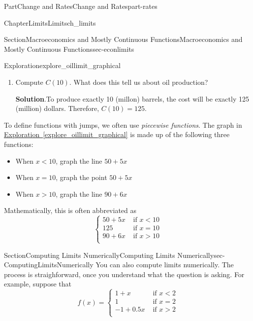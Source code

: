 \documentclass[oneside,10pt,]{tufte-book}
\newcommand{\blocktitlefont}{\relax}
\newcommand{\xreffont}{\relax}
\numberwithin{equation}{chapter}
\newcommand{\lt}{<}
\newcommand{\gt}{>}
\begin{document}
\begin{partptx}{Part}{Change and Rates}{}{Change and Rates}{}{}{part-rates}
\begin{chapterptx}{Chapter}{Limits}{}{Limits}{}{}{ch_limits}
\begin{sectionptx}{Section}{Macroeconomics and Mostly Continuous Functions}{}{Macroeconomics and Mostly Continuous Functions}{}{}{sec-econlimits}
\begin{exploration}{Exploration}{}{explore_oillimit_graphical}
\begin{enumerate}[font=\bfseries,label=(\alph*),ref=\alph*]
\item{}Compute \(C(10).\) What does this tell us about oil production?%
\par\smallskip%
\noindent\textbf{\blocktitlefont Solution}.\hypertarget{explore_oillimit_graphical-4-2}{}\quad{}To produce exactly 10 (millon) barrels, the cost will be exactly \textdollar{}125 (million) dollars. Therefore,   \(C(10)= 125.\)%
\end{enumerate}%
\end{exploration}%
To define functions with jumps, we often use \emph{piecewise functions}. The graph in \hyperref[explore_oillimit_graphical]{Exploration~{\xreffont\ref{explore_oillimit_graphical}}} is made up of the following three functions:%
\begin{itemize}[label=\textbullet]
\item{}When \(x\lt 10\), graph the line \(50 + 5x\)%
\item{}When \(x = 10\), graph the point \(50 + 5x\)%
\item{}When \(x\gt 10\), graph the line \(90 + 6x\)%
\end{itemize}
Mathematically, this is often abbreviated as%
\begin{equation*}
\begin{cases}
50 + 5x & \text{ if } x\lt 10 \\ 
125     & \text{ if } x = 10 \\ 
90 + 6x & \text{ if } x\gt 10 \\ 
\end{cases}
\end{equation*}
%
\end{sectionptx}
%
%
\typeout{************************************************}
\typeout{************************************************}
%
\begin{sectionptx}{Section}{Computing Limits Numerically}{}{Computing Limits Numerically}{}{}{sec-ComputingLimitsNumerically}
You can also compute limits numerically. The process is straighforward, once you understand what the question is asking. For example, suppose that%
\begin{equation*}
f(x) = 
\begin{cases}
1 + x   & \text{ if } x \lt 2 \\   
1       & \text{ if } x = 2 \\   
-1+0.5x & \text{ if } x \gt 2 \\   
\end{cases}
\end{equation*}

\end{sectionptx}
\end{chapterptx}
\end{partptx}
\end{document}
